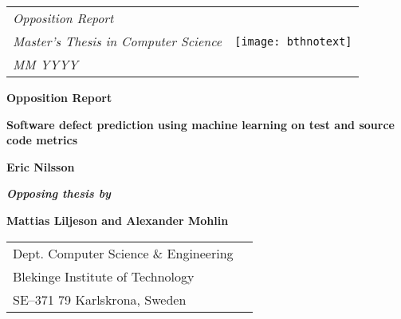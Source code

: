 
\newcommand{\logossize}{3cm}


{\pagestyle{empty}
\changepage{5cm}{1cm}{-0.5cm}{-0.5cm}{}{-2cm}{}{}{}
\noindent%
{\small
\begin{tabular}{p{} p{}}
\textit{Opposition Report}&\multirow{4}{*}{\texttt{[image: bthnotext]}}\\ %
\textit{Master's Thesis in Computer Science}\\
\textit{MM YYYY}\\ %
\end{tabular}}

\begin{center}
\par\vspace {7cm}
{\Huge\textbf{Opposition Report}} %
\par\vspace {0.5cm}
{\Large\textbf{Software defect prediction using machine learning on test and source code metrics}} %
\par\vspace {3cm}
{\Large\textbf{Eric Nilsson}}
\par\vspace{0.5cm}
{\large\textit{\textbf{Opposing thesis by}}}
\par\vspace{0.5cm}
{\Large\textbf{Mattias Liljeson and Alexander Mohlin}}
\par\vspace {6cm}
\end{center}

\noindent
{\small
	\begin{tabular}{p{} p{}}
	Dept. Computer Science \& Engineering&\multirow{4}{*}{}\\
	Blekinge Institute of Technology\\
	SE--371 79 Karlskrona, Sweden
	\end{tabular}}
\clearpage
}


